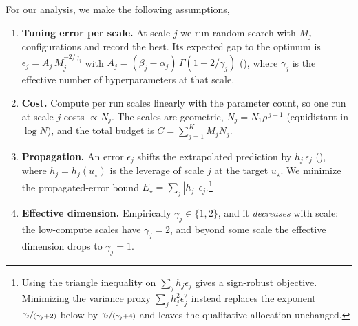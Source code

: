 For our analysis, we make the following assumptions, 
%
\begin{enumerate}[noitemsep]
    \item \textbf{Tuning error per scale.} At scale $j$ we run random search with $M_j$ configurations and record the best. Its expected gap to the optimum is $\epsilon_j = A_j\, M_j^{-2/\gamma_j}$ with $A_j = (\beta_j - \alpha_j)\,\Gamma(1 + 2/\gamma_j)$ (), where $\gamma_j$ is the effective number of hyperparameters at that scale.
    \item \textbf{Cost.} Compute per run scales linearly with the parameter count, so one run at scale $j$ costs $\propto N_j$. The scales are geometric, $N_j = N_1 \rho^{\,j-1}$ (equidistant in $\log N$), and the total budget is $C = \sum_{j=1}^{K} M_j N_j$.
    \item \textbf{Propagation.} An error $\epsilon_j$ shifts the extrapolated prediction by $h_j\,\epsilon_j$ (), where $h_j = h_j(u_\star)$ is the leverage of scale $j$ at the target $u_\star$. We minimize the propagated-error bound $E_\star = \sum_{j} |h_j|\, \epsilon_j$.\footnote{
        Using the triangle inequality on $\sum_j h_j \epsilon_j$ gives a sign-robust objective. Minimizing the variance proxy $\sum_j h_j^2 \epsilon_j^2$ instead replaces the exponent $\nicefrac{\gamma_j}{(\gamma_j + 2)}$ below by $\nicefrac{\gamma_j}{(\gamma_j + 4)}$ and leaves the qualitative allocation unchanged.
    }
    \item \textbf{Effective dimension.} Empirically $\gamma_j \in \{1, 2\}$, and it \emph{decreases} with scale: the low-compute scales have $\gamma_j = 2$, and beyond some scale the effective dimension drops to $\gamma_j = 1$.
\end{enumerate}

